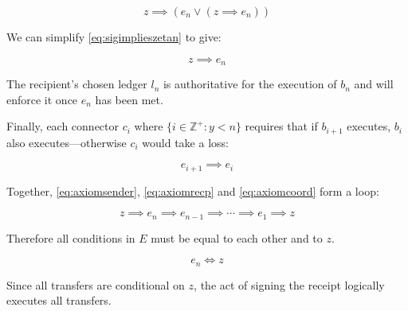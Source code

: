 \documentclass[letterpaper,twocolumn,10pt]{article}
\begin{document}
\begin{equation}
z \implies ( e_n \lor ( z \implies e_n ) ) \label{eq:sigimplieszetan}
\end{equation}

We can simplify \eqref{eq:sigimplieszetan} to give:

\begin{equation}
z \implies e_n \label{eq:axiomrecp}
\end{equation}

The recipient's chosen ledger $l_n$ is authoritative for the execution of $b_n$ and will enforce it once $e_n$ has been met.

Finally, each connector $c_i$ where $\{ i \in \mathbb{Z}^+ : y < n \}$ requires that if $b_{i+1}$ executes, $b_i$ also executes---otherwise $c_i$ would take a loss:

\begin{equation}
e_{i+1} \implies e_i \label{eq:axiomcoord}
\end{equation}

Together, \eqref{eq:axiomsender}, \eqref{eq:axiomrecp} and \eqref{eq:axiomcoord} form a loop:

\begin{equation}
z \implies e_n \implies e_{n-1} \implies \cdots \implies e_1 \implies z
\end{equation}

Therefore all conditions in $E$ must be equal to each other and to $z$.

\begin{equation}
e_n \iff z
\end{equation}

Since all transfers are conditional on $z$, the act of signing the receipt logically executes all transfers.







% 

\end{document}
